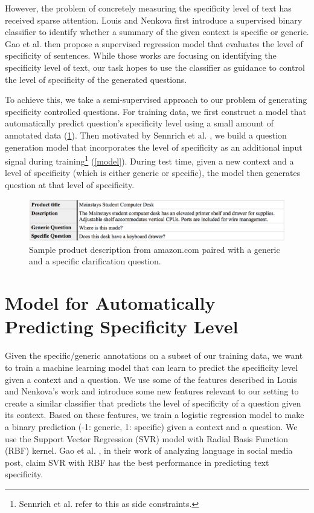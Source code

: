 \documentclass[11pt]{article}
\begin{document}
However, the problem of concretely measuring the specificity level of text has received sparse attention. 
Louis and Nenkova   first introduce a supervised binary classifier to identify whether a summary of the given context is specific or generic. 
Gao et al.  then propose a supervised regression model that evaluates the level of specificity of sentences. 
While those works are focusing on identifying the specificity level of text, our task hopes to use the classifier as guidance to control the level of specificity of the generated questions. 

To achieve this, we take a semi-supervised approach to our problem of generating specificity controlled questions. 
For training data, we first construct a model that automatically predict question's specificity level using a small amount of annotated data (\cref{classifier}).  
Then motivated by Sennrich et al. \cite{sennrich2016controlling}, we build a question generation model that incorporates the level of specificity as an additional input signal during training\footnote{Sennrich et al. \cite{sennrich2016controlling} refer to this as side constraints.} (\cref{model}). 
During test time, given a new context and a level of specificity (which is either generic or specific), the model then generates question at that level of specificity.

\begin{figure}[h]
	\includegraphics[width=\textwidth]{amaz-ex.png}
    \caption{Sample product description from amazon.com paired with a generic and a specific clarification question.}\label{amazon-ex-1}
\end{figure}



\section{Model for Automatically Predicting Specificity Level}\label{classifier}

Given the specific/generic annotations on a subset of our training data, we want to train a machine learning model that can learn to predict the specificity level given a context and a question. We use some of the features described in Louis and Nenkova's work \cite{louis2011automatic} and introduce some new features relevant to our setting to create a similar classifier that predicts the level of specificity of a question given its context. Based on these features, we train a logistic regression model to make a binary prediction (-1: generic, 1: specific) given a context and a question. We use the Support Vector Regression (SVR) model with Radial Basis Function (RBF) kernel. Gao et al. , in their work of analyzing language in social media post, claim SVR with RBF has the best performance in predicting text specificity.\\
\end{document}
